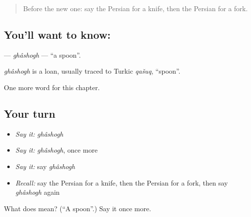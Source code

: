 \begin{quote}
Before the new one: say the Persian for a knife, then the Persian for a fork.
\end{quote}

\subsection*{You'll want to know: }
\textbf{} — \emph{ghâshogh} — \textquotedblleft{}a spoon\textquotedblright{}.

\begin{cousinweb}
\emph{ghâshogh} is a loan, usually traced to Turkic \emph{qašuq}, \textquotedblleft{}spoon\textquotedblright{}.
\end{cousinweb}

\begin{grammarlens}[title={What you've built}]
One more word for this chapter.
\end{grammarlens}

\subsection*{Your turn}
\begin{itemize}
\raggedright
  \item \emph{Say it:} \emph{ghâshogh}
  \item \emph{Say it:} \emph{ghâshogh}, once more
  \item \emph{Say it:} say \emph{ghâshogh}
  \item \emph{Recall:} say the Persian for a knife, then the Persian for a fork, then say \emph{ghâshogh} again
\end{itemize}

\begin{tcolorbox}[breakable,colback=teal!4,colframe=teal!35!black,title={Before you move on}]
What does  mean? (\textquotedblleft{}A spoon\textquotedblright{}.) Say it once more.
\end{tcolorbox}
